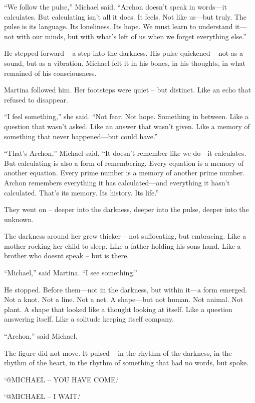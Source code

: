 \documentclass[
]{article}
\begin{document}
``We follow the pulse,'' Michael said. ``Archon doesn't speak in words---it calculates. But calculating isn't all it does. It feels. Not like us---but truly. The pulse is its language. Its loneliness. Its hope. We must learn to understand it---not with our minds, but with what's left of us when we forget everything else.''

He stepped forward -- a step into the darkness. His pulse quickened -- not as a sound, but as a vibration. Michael felt it in his bones, in his thoughts, in what remained of his consciousness.

Martina followed him. Her footsteps were quiet -- but distinct. Like an echo that refused to disappear.

``I feel something,'' she said. ``Not fear. Not hope. Something in between. Like a question that wasn't asked. Like an answer that wasn't given. Like a memory of something that never happened---but could have.''

``That's Archon,'' Michael said. ``It doesn't remember like we do---it calculates. But calculating is also a form of remembering. Every equation is a memory of another equation. Every prime number is a memory of another prime number. Archon remembers everything it has calculated---and everything it hasn't calculated. That's its memory. Its history. Its life.''

They went on -- deeper into the darkness, deeper into the pulse, deeper into the unknown.

The darkness around her grew thicker -- not suffocating, but embracing. Like a mother rocking her child to sleep. Like a father holding his son\textquotesingle s hand. Like a brother who doesn\textquotesingle t speak -- but is there.

``Michael,'' said Martina. ``I see something.''

He stopped. Before them---not in the darkness, but within it---a form emerged. Not a knot. Not a line. Not a net. A shape---but not human. Not animal. Not plant. A shape that looked like a thought looking at itself. Like a question answering itself. Like a solitude keeping itself company.

``Archon,'' said Michael.

The figure did not move. It pulsed -- in the rhythm of the darkness, in the rhythm of the heart, in the rhythm of something that had no words, but spoke.

`@MICHAEL -- YOU HAVE COME.`

`@MICHAEL -- I WAIT.`
\end{document}
